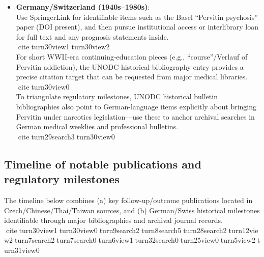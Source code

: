 \begin{itemize}
  ThaiJO-hosted journals and hospital evaluation repositories (e.g., Thanyarak hospital networks) provide downloadable PDFs for medium-term follow‑ups (3--12 months) and program monitoring. citeturn31view0turn15view3\\
  If specific ONCB/NCTC PDFs time out in a browser context, request them via official archive channels or search for mirrored copies through university repositories; the topic appears to be maintained in government knowledge portals even if technical stability varies. citeturn17search1turn12view2
\item
  \textbf{Germany/Switzerland (1940s--1980s)}:\\
  Use SpringerLink for identifiable items such as the Basel ``Pervitin psychosis'' paper (DOI present), and then pursue institutional access or interlibrary loan for full text and any prognosis statements inside. citeturn30view1turn30view2\\
  For short WWII‑era continuing‑education pieces (e.g., ``course''/Verlauf of Pervitin addiction), the UNODC historical bibliography entry provides a precise citation target that can be requested from major medical libraries. citeturn30view0\\
  To triangulate regulatory milestones, UNODC historical bulletin bibliographies also point to German-language items explicitly about bringing Pervitin under narcotics legislation---use these to anchor archival searches in German medical weeklies and professional bulletins. citeturn29search3turn30view0
\end{itemize}

\subsection{Timeline of notable publications and regulatory milestones}\label{13_non_english-timeline-of-notable-publications-and-regulatory-milestones}

The timeline below combines (a) key follow-up/outcome publications located in Czech/Chinese/Thai/Taiwan sources, and (b) German/Swiss historical milestones identifiable through major bibliographies and archival journal records. citeturn30view1turn30view0turn9search2turn8search5turn28search2turn12view2turn7search2turn7search0turn6view1turn32search0turn25view0turn5view2turn31view0

